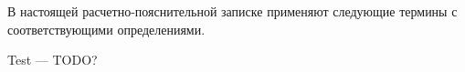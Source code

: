
В настоящей расчетно-пояснительной записке применяют следующие термины с соответствующими определениями.\\

\begin{description}
	\item{Test} --- TODO?
\end{description}
